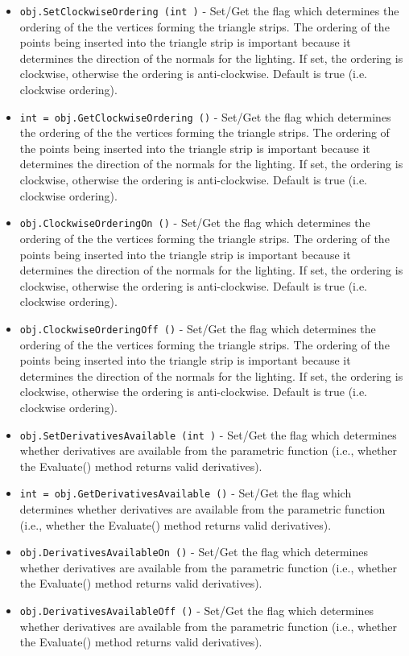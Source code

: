 \begin{itemize}
\item  \verb|obj.SetClockwiseOrdering (int )| -  Set/Get the flag which determines the ordering of the the 
 vertices forming the triangle strips. The ordering of the 
 points being inserted into the triangle strip is important 
 because it determines the direction of the normals for the 
 lighting. If set, the ordering is clockwise, otherwise the
 ordering is anti-clockwise. Default is true (i.e. clockwise
 ordering).

\item  \verb|int = obj.GetClockwiseOrdering ()| -  Set/Get the flag which determines the ordering of the the 
 vertices forming the triangle strips. The ordering of the 
 points being inserted into the triangle strip is important 
 because it determines the direction of the normals for the 
 lighting. If set, the ordering is clockwise, otherwise the
 ordering is anti-clockwise. Default is true (i.e. clockwise
 ordering).

\item  \verb|obj.ClockwiseOrderingOn ()| -  Set/Get the flag which determines the ordering of the the 
 vertices forming the triangle strips. The ordering of the 
 points being inserted into the triangle strip is important 
 because it determines the direction of the normals for the 
 lighting. If set, the ordering is clockwise, otherwise the
 ordering is anti-clockwise. Default is true (i.e. clockwise
 ordering).

\item  \verb|obj.ClockwiseOrderingOff ()| -  Set/Get the flag which determines the ordering of the the 
 vertices forming the triangle strips. The ordering of the 
 points being inserted into the triangle strip is important 
 because it determines the direction of the normals for the 
 lighting. If set, the ordering is clockwise, otherwise the
 ordering is anti-clockwise. Default is true (i.e. clockwise
 ordering).

\item  \verb|obj.SetDerivativesAvailable (int )| -  Set/Get the flag which determines whether derivatives are available 
 from the parametric function (i.e., whether the Evaluate() method 
 returns valid derivatives).

\item  \verb|int = obj.GetDerivativesAvailable ()| -  Set/Get the flag which determines whether derivatives are available 
 from the parametric function (i.e., whether the Evaluate() method 
 returns valid derivatives).

\item  \verb|obj.DerivativesAvailableOn ()| -  Set/Get the flag which determines whether derivatives are available 
 from the parametric function (i.e., whether the Evaluate() method 
 returns valid derivatives).

\item  \verb|obj.DerivativesAvailableOff ()| -  Set/Get the flag which determines whether derivatives are available 
 from the parametric function (i.e., whether the Evaluate() method 
 returns valid derivatives).

\end{itemize}
